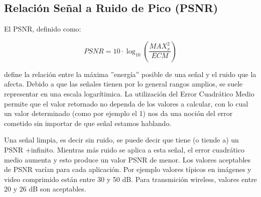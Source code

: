 \subsection {Relaci\'on Se\~nal a Ruido de Pico (PSNR)}

El PSNR, definido como:

$$
\mathit{PSNR} = 10 \cdot \log_{10} \left( \frac{\mathit{MAX}^2_x}{\mathit{ECM}}
\right)
$$

define la relaci\'on entre la m\'axima ''energ\'ia'' posible de una se\~nal y el
ruido que la afecta. Debido a que las se\~nales tienen por lo general rangos
amplios, se suele representar en una escala logar\'itimica. La utilizaci\'on del
 Error Cuadr\'atico Medio permite que el valor retornado no dependa de los
valores a calcular, con lo cual un valor determinado (como por ejemplo el 1) nos
da una noci\'on del error cometido sin importar de que se\~nal estamos hablando.

Una se\~nal limpia, es decir sin ruido, se puede decir que tiene (o tiende a) un PSNR
+infinito. Mientras m\'as ruido se aplica a esta se\~nal, el error cuadr\'atico
medio aumenta y esto produce un valor PSNR de menor. Los valores aceptables de
PSNR var\'ian para cada aplicaci\'on. Por ejemplo valores t\'ipicos en
im\'agenes y video comprimido est\'an entre 30 y 50 dB. Para transmici\'on
wireless, valores entre 20 y 26 dB son aceptables. 
